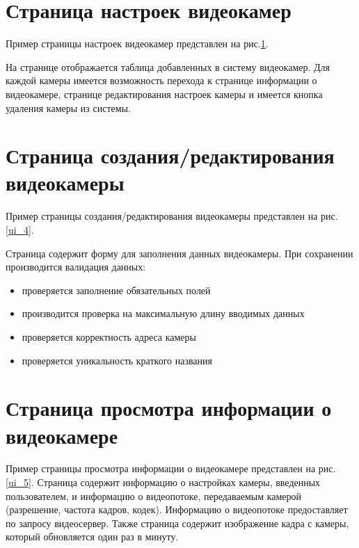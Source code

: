 \section{Страница настроек видеокамер}
Пример страницы настроек видеокамер представлен на рис.\ref{ui_6}.

На странице отображается таблица добавленных в систему видеокамер.
Для каждой камеры имеется возможность перехода к странице информации о видеокамере,
странице редактирования настроек камеры и имеется кнопка удаления камеры из системы.

\begin{figure}[!htb]
\def\svgwidth{\columnwidth}
\caption{}
\label{ui_6}
\end{figure}

\section{Страница создания/редактирования видеокамеры}
Пример страницы создания/редактирования видеокамеры представлен на рис.\ref{ui_4}.

Страница содержит форму для заполнения данных видеокамеры.
При сохранении производится валидация данных:
\smallskip
\begin{itemize}
\item проверяется заполнение обязательных полей
\item производится проверка на максимальную длину вводимых данных
\item проверяется корректность адреса камеры
\item проверяется уникальность краткого названия
\end{itemize}

\section{Страница просмотра информации о видеокамере}
Пример страницы просмотра информации о видеокамере представлен на рис.\ref{ui_5}.
Страница содержит информацию о настройках камеры, введенных пользователем, и информацию
о видеопотоке, передаваемым камерой (разрешение, частота кадров, кодек).
Информацию о видеопотоке предоставляет по запросу видеосервер.
Также страница содержит изображение кадра с камеры, который обновляется один раз в минуту.

